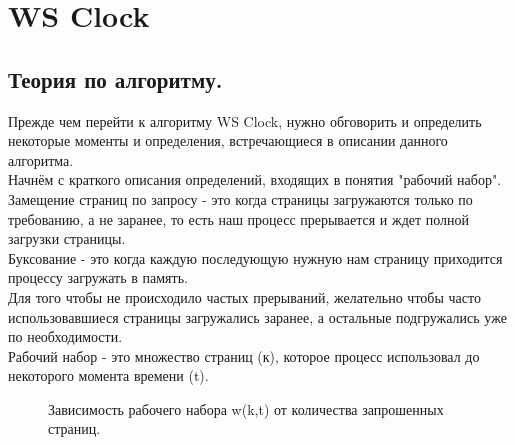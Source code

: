 \newpage

\section{WS Clock} 

\subsection{Теория по алгоритму.}
Прежде чем перейти к алгоритму WS Clock, нужно обговорить и определить некоторые моменты и определения, встречающиеся в описании данного алгоритма.\\
Начнём с краткого описания определений, входящих в понятия "рабочий набор". \\
Замещение страниц по запросу - это когда страницы загружаются только по требованию, а не заранее, то есть наш процесс прерывается и ждет полной загрузки страницы. \\ 
Буксование - это когда каждую последующую нужную нам страницу приходится процессу загружать в память.\\
Для того чтобы не происходило частых прерываний, желательно чтобы часто использовавшиеся страницы загружались заранее, а остальные подгружались уже по необходимости.\\
Рабочий набор - это множество страниц (к), которое процесс использовал до некоторого момента времени (t).

\begin{figure}[h]
\caption{Зависимость рабочего набора w(k,t) от количества запрошенных страниц.}
\end{figure}


